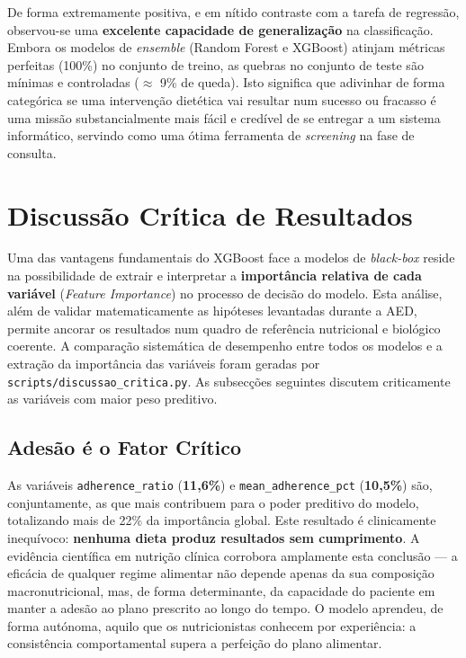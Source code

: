 De forma extremamente positiva, e em nítido contraste com a tarefa de regressão, observou-se uma \textbf{excelente capacidade de generalização} na classificação. Embora os modelos de \textit{ensemble} (Random Forest e XGBoost) atinjam métricas perfeitas (100\%) no conjunto de treino, as quebras no conjunto de teste são mínimas e controladas ($\approx$ 9\% de queda). Isto significa que adivinhar de forma categórica se uma intervenção dietética vai resultar num sucesso ou fracasso é uma missão substancialmente mais fácil e credível de se entregar a um sistema informático, servindo como uma ótima ferramenta de \textit{screening} na fase de consulta.


\section{Discuss\~ao Cr\'itica de Resultados}
\label{sec:discussao}

Uma das vantagens fundamentais do XGBoost face a modelos de \textit{black-box} reside na possibilidade de extrair e interpretar a \textbf{importância relativa de cada variável} (\textit{Feature Importance}) no processo de decisão do modelo. Esta análise, além de validar matematicamente as hipóteses levantadas durante a AED, permite ancorar os resultados num quadro de referência nutricional e biológico coerente. A comparação sistemática de desempenho entre todos os modelos e a extração da importância das variáveis foram geradas por \texttt{scripts/discussao\_critica.py}. As subsecções seguintes discutem criticamente as variáveis com maior peso preditivo.

\subsection{Ades\~ao \'e o Fator Cr\'itico}

As variáveis \texttt{adherence\_ratio} (\textbf{11,6\%}) e \texttt{mean\_adherence\_pct} (\textbf{10,5\%}) são, conjuntamente, as que mais contribuem para o poder preditivo do modelo, totalizando mais de 22\% da importância global. Este resultado é clinicamente inequívoco: \textbf{nenhuma dieta produz resultados sem cumprimento}. A evidência científica em nutrição clínica corrobora amplamente esta conclusão --- a eficácia de qualquer regime alimentar não depende apenas da sua composição macronutricional, mas, de forma determinante, da capacidade do paciente em manter a adesão ao plano prescrito ao longo do tempo. O modelo aprendeu, de forma autónoma, aquilo que os nutricionistas conhecem por experiência: a consistência comportamental supera a perfeição do plano alimentar.

